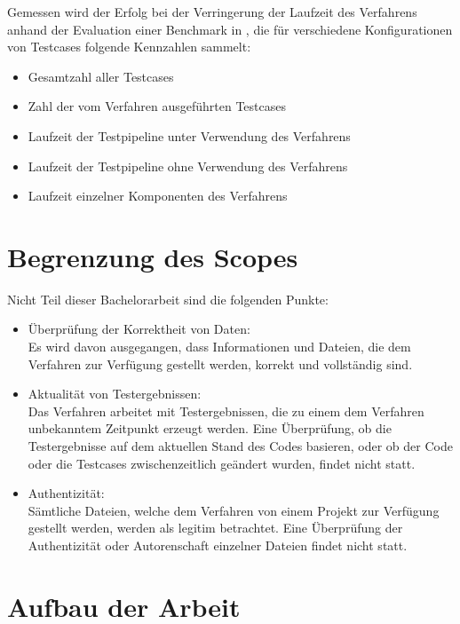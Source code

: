 Gemessen wird der Erfolg bei der Verringerung der Laufzeit des Verfahrens anhand der Evaluation einer Benchmark in , die für verschiedene Konfigurationen von Testcases folgende Kennzahlen sammelt:
\begin{itemize}
      \item Gesamtzahl aller Testcases
      \item Zahl der vom Verfahren ausgeführten Testcases
      \item Laufzeit der Testpipeline unter Verwendung des Verfahrens
      \item Laufzeit der Testpipeline ohne Verwendung des Verfahrens
      \item Laufzeit einzelner Komponenten des Verfahrens
\end{itemize}

\section{Begrenzung des Scopes}\label{chap:limit_scope}
Nicht Teil dieser Bachelorarbeit sind die folgenden Punkte:
\begin{itemize}
      \item Überprüfung der Korrektheit von Daten:\\
      Es wird davon ausgegangen, dass Informationen und Dateien, die dem Verfahren zur Verfügung gestellt werden, korrekt und vollständig sind.
      \item Aktualität von Testergebnissen:\\
      Das Verfahren arbeitet mit Testergebnissen, die zu einem dem Verfahren unbekanntem Zeitpunkt erzeugt werden. Eine Überprüfung, ob die Testergebnisse auf dem aktuellen Stand des Codes basieren, oder ob der Code oder die Testcases zwischenzeitlich geändert wurden, findet nicht statt.
      \item Authentizität:\\
      Sämtliche Dateien, welche dem Verfahren von einem Projekt zur Verfügung gestellt werden, werden als legitim betrachtet. Eine Überprüfung der Authentizität oder Autorenschaft einzelner Dateien findet nicht statt.
\end{itemize}

\section{Aufbau der Arbeit}

